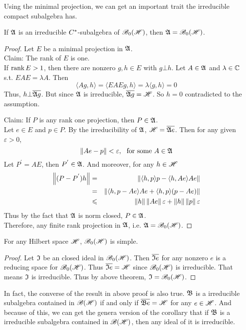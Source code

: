 \documentclass[a4paper,11pt]{report}
\begin{document}
Using the minimal projection, we can get an important trait the irreducible compact subalgebra has.
\begin{thm}
	If $\mathfrak{A}$ is an irreducible $C^{*}$-subalgebra of $\mathscr{B}_{0}\mathscr{(H)}$, then $\mathfrak{A} = \mathscr{B}_{0}\mathscr{(H)}$.
\end{thm}
\begin{proof}
	Let $E$ be a minimal projection in $\mathfrak{A}$.\\
	Claim: The rank of $E$ is one. \\
	If $\operatorname{rank}{E} > 1$, then there are nonzero $g,h \in E$ with $g \bot h$. Let $A \in \mathfrak{A}$ and $\lambda \in \mathbb{C}$ s.t. $EAE = \lambda A$. Then
	\begin{equation*}
		\langle Ag,h \rangle = \langle EAEg,h \rangle = \lambda \langle g,h \rangle = 0
	\end{equation*}
	Thus, $h \bot \overline{\mathfrak{A} g}$. But since $\mathfrak{A}$ is irreducible, $\overline{\mathfrak{A} g} = \mathscr{H}$. So $h = 0$ contradicted to the assumption.
	\item Claim: If $P$ is any rank one projection, then $P \in \mathfrak{A}$. \\
	Let $e \in E$ and $p \in P$. By the irreducibility of $\mathfrak{A}$, $\mathscr{H} = \overline{\mathfrak{A} e}$. Then for any given $\varepsilon > 0$, 
	\begin{equation*}
		\left\lVert Ae - p\right\lVert < \varepsilon,~ \text{ for some } A \in \mathfrak{A}
	\end{equation*}
	Let $P^{'} = AE$, then $P^{'} \in \mathfrak{A}$. And moreover, for any $h \in \mathscr{H}$
	\begin{eqnarray*}
		\left\lVert(P-P^{'})h\right\lVert &=& \left\lVert\langle h,p \rangle p - \langle h, Ae \rangle Ae\right\lVert\\ 
		&=& \left\lVert\langle h,p-Ae \rangle Ae + \langle h,p \rangle (p-Ae)\right\lVert \\
		&\leqslant& \left\lVert h\right\lVert \left\lVert Ae\right\lVert \varepsilon + \left\lVert h\right\lVert\left\lVert p\right\lVert \varepsilon
	\end{eqnarray*}
	Thus by the fact that $\mathfrak{A}$ is norm closed, $P \in \mathfrak{A}$. \\
	Therefore, any finite rank projection in $\mathfrak{A}$, i.e. $\mathfrak{A} = \mathscr{B}_{0}\mathscr{(H)}$.
\end{proof}

\begin{cor}
	For any Hilbert space $\mathscr{H}$, $\mathscr{B}_{0}\mathscr{(H)}$ is simple.
\end{cor}
\begin{proof}
	Let $\mathfrak{I}$ be an closed ideal in $\mathscr{B}_{0}\mathscr{(H)}$. Then $\overline{\mathfrak{I} e}$ for any nonzero $e$ is a reducing space for $\mathscr{B}_{0}\mathscr{(H)}$. Thus $\overline{\mathfrak{I} e} = \mathscr{H}$ since $\mathscr{B}_{0}\mathscr{(H)}$ is irreducible. That means $\mathfrak{I}$ is irreducible. Thus by above theorem, $\mathfrak{I} = \mathscr{B}_{0}\mathscr{(H)}$.
\end{proof}
\begin{rem}
	In fact, the converse of the result in above proof is also true. $\mathfrak{B}$ is a irreducible subalgebra contained in $\mathscr{B(H)}$ if and only if $\overline{\mathfrak{B} e} = \mathscr{H}$ for any $e \in \mathscr{H}$. And because of this, we can get the genera version of the corollary that if $\mathfrak{B}$ is a irreducible subalgebra contained in $\mathscr{B(H)}$, then any ideal of it is irreducible.
\end{rem}
\end{document}
